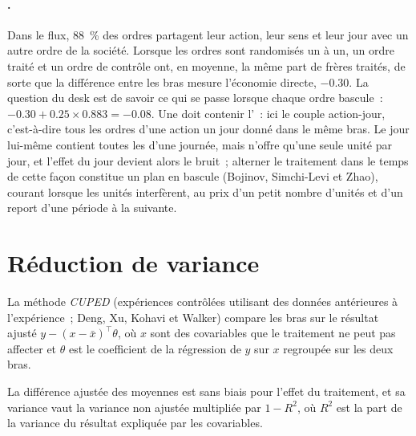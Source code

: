 \paragraph{.} Dans le flux, 88~\% des ordres partagent leur action, leur sens et leur jour avec un autre ordre de la société. Lorsque les ordres sont randomisés un à
un, un ordre traité et un ordre de contrôle ont, en moyenne, la même part de frères traités, de sorte que la différence entre les bras mesure
l'économie directe, $-0.30$. La question du desk est de savoir ce qui se passe lorsque chaque ordre bascule~: $-0.30 + 0.25 \times 0.883 = -0.08$. Une  doit contenir
l'~: ici le couple action-jour, c'est-à-dire tous les ordres d'une action un jour donné dans le même bras. Le jour lui-même contient toutes les  d'une journée, mais
n'offre qu'une seule unité par jour, et l'effet du jour devient alors le bruit~; alterner le traitement dans le temps de cette façon constitue un plan en bascule (Bojinov, Simchi-Levi
et Zhao), courant lorsque les unités interfèrent, au prix d'un petit nombre d'unités et d'un report d'une période à la suivante.

\label{lst:rs:live-experiments:cluster}

\section{Réduction de variance}

\begin{definition}[CUPED]\label{def:rs:live-experiments:cuped}
La méthode \emph{CUPED} (expériences contrôlées utilisant des données antérieures à l'expérience~; Deng, Xu, Kohavi et Walker) compare les bras sur le résultat ajusté
$y - (x - \bar x)^\top\theta$, où $x$ sont des covariables que le traitement ne peut pas affecter et $\theta$ est le coefficient de la régression de $y$ sur $x$ regroupée sur
les deux bras.
\end{definition}

\begin{proposition}\label{prop:rs:live-experiments:cuped}
La différence ajustée des moyennes est sans biais pour l'effet du traitement, et sa variance vaut la variance non ajustée multipliée par $1 - R^2$, où $R^2$ est la part de
la variance du résultat expliquée par les covariables.
\end{proposition}

